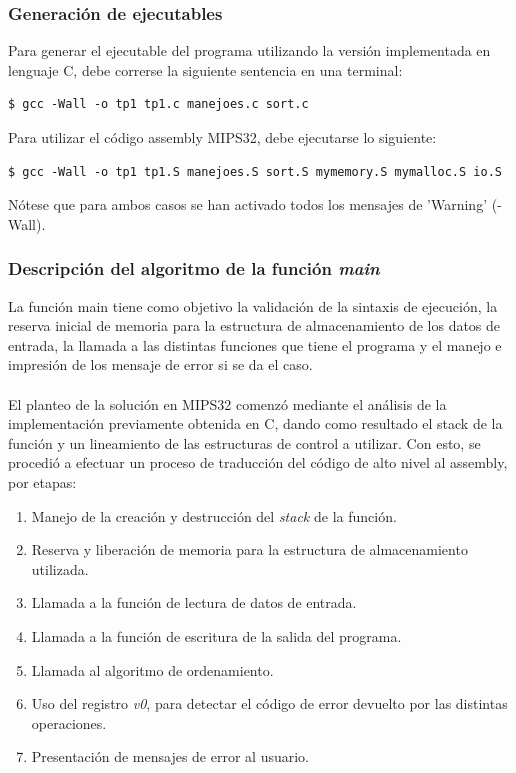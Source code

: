 \documentclass[a4paper,10pt]{article}
\begin{document}
\subsubsection{Generaci\'on de ejecutables}
Para generar el ejecutable del programa utilizando la versi\'on implementada en lenguaje C, debe correrse la siguiente sentencia en una terminal:
\begin{verbatim}
$ gcc -Wall -o tp1 tp1.c manejoes.c sort.c
\end{verbatim}

Para utilizar el c\'odigo assembly MIPS32, debe ejecutarse lo siguiente:
\begin{verbatim}
$ gcc -Wall -o tp1 tp1.S manejoes.S sort.S mymemory.S mymalloc.S io.S
\end{verbatim}

N\'otese que para ambos casos se han activado todos los mensajes de 'Warning' (-Wall).

\subsubsection{Descripci\'on del algoritmo de la funci\'on \textit{main}}
La funci\'on main tiene como objetivo la validaci\'on de la sintaxis de ejecuci\'on, la reserva inicial de memoria para la estructura de almacenamiento de los datos de entrada, la llamada a las distintas funciones que tiene el programa y el manejo e impresi\'on de los mensaje de error si se da el caso.\\
\\El planteo de la soluci\'on en MIPS32 comenz\'o mediante el an\'alisis de la implementaci\'on previamente obtenida en C, dando como resultado el stack de la funci\'on y un lineamiento de las estructuras de control a utilizar. Con esto, se procedi\'o a efectuar un proceso de traducci\'on del c\'odigo de alto nivel al assembly, por etapas:

\begin{enumerate}
\item 
Manejo de la creaci\'on y destrucci\'on del \textit{stack} de la funci\'on.
\item
Reserva y liberaci\'on de memoria para la estructura de almacenamiento utilizada.
\item
Llamada a la funci\'on de lectura de datos de entrada.
\item
Llamada a la funci\'on de escritura de la salida del programa.
\item
Llamada al algoritmo de ordenamiento.
\item
Uso del registro \textit{v0}, para detectar el c\'odigo de error devuelto por las distintas operaciones.
\item
Presentaci\'on de mensajes de error al usuario.
\end{enumerate}
\end{document}
